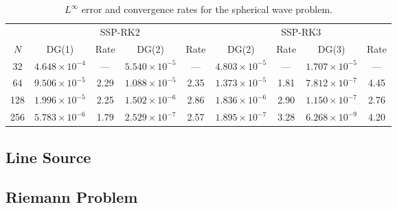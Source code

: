 \documentclass[10pt,preprint]{aastex}
\begin{document}
\begin{table}
  \begin{center}
  \caption{$L^{\infty}$ error and convergence rates for the spherical wave problem.}
  \label{tab:sphericalWave}
  \begin{tabular}{ccccccccc}
    & \multicolumn{4}{c}{SSP-RK2} & \multicolumn{4}{c}{SSP-RK3} \\
    \cmidrule(r){2-5} \cmidrule(r){6-9}
    $N$ & DG(1) & Rate & DG(2) & Rate & DG(2) & Rate & DG(3) & Rate \\
    \midrule \midrule
    32   & $4.648\times10^{-4}$ & ---  & $5.540\times10^{-5}$ & ---   & $4.803\times10^{-5}$ & ---  & $1.707\times10^{-5}$ & --- \\
    64   & $9.506\times10^{-5}$ &2.29& $1.088\times10^{-5}$ &2.35& $1.373\times10^{-5}$ &1.81& $7.812\times10^{-7}$ &4.45 \\
    128 & $1.996\times10^{-5}$ &2.25& $1.502\times10^{-6}$ &2.86& $1.836\times10^{-6}$ &2.90& $1.150\times10^{-7}$ &2.76 \\
    256 & $5.783\times10^{-6}$ &1.79& $2.529\times10^{-7}$ &2.57& $1.895\times10^{-7}$ &3.28& $6.268\times10^{-9}$ &4.20 \\
    \midrule \midrule
  \end{tabular}
  \end{center}
\end{table}

\subsection{Line Source}

\subsection{Riemann Problem}
\end{document}
